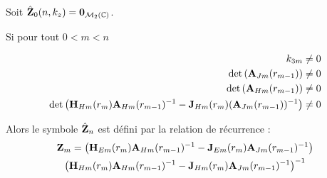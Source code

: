     \begin{thm}
      Soit \(\hat {\mathbf{Z}}_0(n,k_z) = \mathbf{0}_{\mathcal{M}_2(\mathbb C)}\).

      Si pour tout \(0 < m < n\)

      \begin{equation}
        \begin{aligned}
          k_{3m} & \not = 0 \\
          \det\left(\mathbf{A}_{Jm}(r_{m-1})\right) & \not = 0
          \\
          \det\left(\mathbf{A}_{Hm}(r_{m-1})\right) & \not = 0
          \\
          \det\left(\mathbf{H}_{Hm}(r_{m})\mathbf{A}_{Hm}(r_{m-1})^{-1} - \mathbf{J}_{Hm}(r_{m})(\mathbf{A}_{Jm}(r_{m-1}))^{-1}\right) &\not = 0
        \end{aligned}
      \end{equation}

      Alors le symbole \(\hat {\mathbf{Z}}_n\) est défini par la relation de récurrence :
      \begin{multline}
        \mathbf{Z}_m = \left(\mathbf{H}_{Em}(r_m)\mathbf{A}_{Hm}(r_{m-1})^{-1} - \mathbf{J}_{Em}(r_m)\mathbf{A}_{Jm}(r_{m-1})^{-1}\right) \\
            \left(\mathbf{H}_{Hm}(r_m)\mathbf{A}_{Hm}(r_{m-1})^{-1} - \mathbf{J}_{Hm}(r_m)\mathbf{A}_{Jm}(r_{m-1})^{-1}\right)^{-1}
      \end{multline}
    \end{thm}


